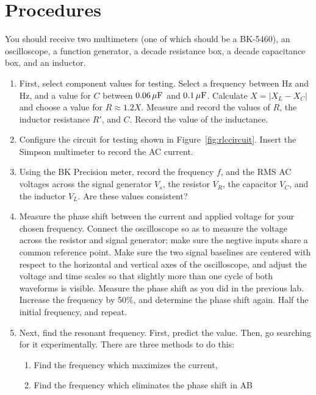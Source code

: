 \documentclass[12pt]{article}
\begin{document}
\section{Procedures}
\label{sec:procedures}

You should receive two multimeters (one of which should be a
BK-5460), an oscilloscope, a function generator, a
decade resistance box, a decade capacitance box, and an inductor.

\begin{enumerate}
\item First, select component values for testing.  Select a frequency
  between \unit[300]{Hz} and \unit[600]{Hz}, and a value for $C$
  between $\unit[0.06]{\mu F}$ and $\unit[0.1]{\mu F}$.  Calculate $X
  = \left| X_L-X_C \right|$ and choose a value for $R \approx 1.2 X$.
  Measure and record the values of $R$, the inductor resistance $R'$,
  and $C$.  Record the value of the inductance.
\item Configure the circuit for testing shown in
  Figure~\ref{fig:rlccircuit}.  Insert the Simpson multimeter to
  record the AC current.
\item Using the BK Precision meter, record the frequency $f$, and the
  RMS AC voltages across the signal generator $V_s$, the resistor
  $V_R$, the capacitor $V_C$, and the inductor $V_L$.  Are these
  values consistent?
\item \label{item:phase} Measure the phase shift between the current
  and applied voltage for your chosen frequency.  Connect the
  oscilloscope so as to measure the voltage across the resistor and
  signal generator; make sure the negtive inputs share a common
  reference point.  Make sure the two signal baselines are centered
  with respect to the horizontal and vertical axes of the
  oscilloscope, and adjust the voltage and time scales so that
  slightly more than one cycle of both waveforms is visible.  Measure
  the phase shift as you did in the previous lab.  Increase the
  frequency by 50\%, and determine the phase shift again.  Half the
  initial frequency, and repeat.
\item \label{item:phase_resonance} Next, find the resonant frequency.
  First, predict the value.  Then, go searching for it experimentally.
  There are three methods to do this:
  \begin{enumerate}
  \item Find the frequency which maximizes the current, 
  \item Find the frequency which eliminates the phase shift in AB

\end{enumerate}
\end{enumerate}
\end{document}
